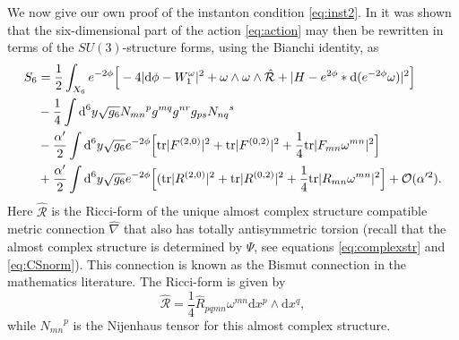 \documentclass[12pt,a4paper]{article}
\def\a{\alpha'}
\def\d{\textrm{d}}
\def\tr{\textrm{tr}}
\def\OO{\mathcal{O}}
\theoremstyle{definition}
\begin{document}
We now give our own proof of the instanton condition \eqref{eq:inst2}. In \cite{LopesCardoso:2003af} it was shown that the six-dimensional part of the action \eqref{eq:action} may then be rewritten in terms of the $SU(3)$-structure forms, using the Bianchi identity, as 
\begin{align}
\label{eq:6daction}
S_6&=\frac{1}{2}\int_{X_6}e^{-2\phi}\Big[-4\vert\d\phi-W_1^\omega\vert^2+\omega\wedge\omega\wedge\mathcal{\hat R}+\vert H-e^{2\phi}*\d(e^{-2\phi}\omega)\vert^2\Big]\notag\\
&-\frac{1}{4}\int\d ^6y\sqrt{g_6}{N_{mn}}^pg^{mq}g^{nr}g_{ps}{N_{nq}}^s\notag \\
&-\frac{\alpha'}{2}\int\d ^6y\sqrt{g_6}e^{-2\phi}\Big[\tr\vert F^{(2,0)}\vert^2+\tr\vert F^{(0,2)}\vert^2+\frac{1}{4}\tr\vert F_{mn}\omega^{mn}\vert^2\Big]\notag\\
&+\frac{\alpha'}{2}\int\d ^6y\sqrt{g_6}e^{-2\phi}\Big[(\tr\vert{R}^{(2,0)}\vert^2+\tr\vert {R}^{(0,2)}\vert^2+\frac{1}{4}\tr\vert R_{mn}\omega^{mn}\vert^2\Big]+\OO(\a^2).
\end{align}
Here $\mathcal{\hat R}$ is the Ricci-form of the unique almost complex structure compatible metric connection $\hat\nabla$ that also has totally antisymmetric torsion (recall that  the almost complex structure is determined by $\Psi$, see equations \eqref{eq:complexstr} and \eqref{eq:CSnorm}). This connection is known as the Bismut connection in the mathematics literature. The Ricci-form is given by
\begin{equation}
\mathcal{\hat R}=\frac{1}{4}\hat R_{pqmn}\omega^{mn}\d x^p\wedge\d x^q,
\end{equation}
while ${N_{mn}}^p$ is the Nijenhaus tensor for this almost complex structure. 
\end{document}
